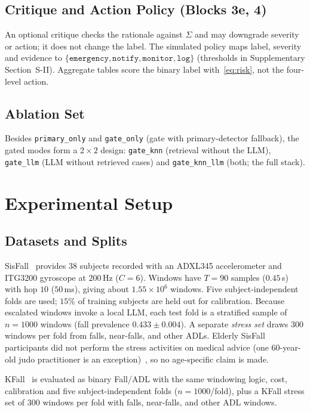 \documentclass[journal]{IEEEtran}
\begin{document}
\subsection{Critique and Action Policy (Blocks 3e, 4)}
An optional critique checks the rationale against $\Sigma$ and may downgrade
severity or action; it does not change the label. The simulated policy maps
label, severity and evidence to
$\{\texttt{emergency},\texttt{notify},\texttt{monitor},\texttt{log}\}$
(thresholds in Supplementary Section~S-II). Aggregate tables score the binary
label with~\eqref{eq:risk}, not the four-level action.

\subsection{Ablation Set}
Besides \texttt{primary\_only} and \texttt{gate\_only} (gate with primary-detector fallback), the gated modes form a $2{\times}2$ design: \texttt{gate\_knn} (retrieval without the LLM), \texttt{gate\_llm} (LLM without retrieved cases) and \texttt{gate\_knn\_llm} (both; the full stack).

\section{Experimental Setup}
\label{sec:setup}

\subsection{Datasets and Splits}
SisFall~\cite{sisfall2017} provides $38$ subjects recorded with an ADXL345 accelerometer and ITG3200 gyroscope at $200$\,Hz ($C{=}6$). Windows have $T{=}90$ samples ($0.45$\,s) with hop $10$ ($50$\,ms), giving about $1.55{\times}10^6$ windows. Five subject-independent folds are used; $15\%$ of training subjects are held out for calibration. Because escalated windows invoke a local LLM, each test fold is a stratified sample of $n{=}1000$ windows (fall prevalence $0.433{\pm}0.004$). A separate \emph{stress set} draws $300$ windows per fold from falls, near-falls, and other ADLs. Elderly SisFall participants did not perform the stress activities on medical advice (one 60-year-old judo practitioner is an exception)~\cite{sisfall2017}, so no age-specific claim is made.

KFall~\cite{kfall2021} is evaluated as binary Fall/ADL with the same windowing logic, cost, calibration and five subject-independent folds ($n{=}1000$/fold), plus a KFall stress set of $300$ windows per fold with falls, near-falls, and other ADL windows.
\end{document}
